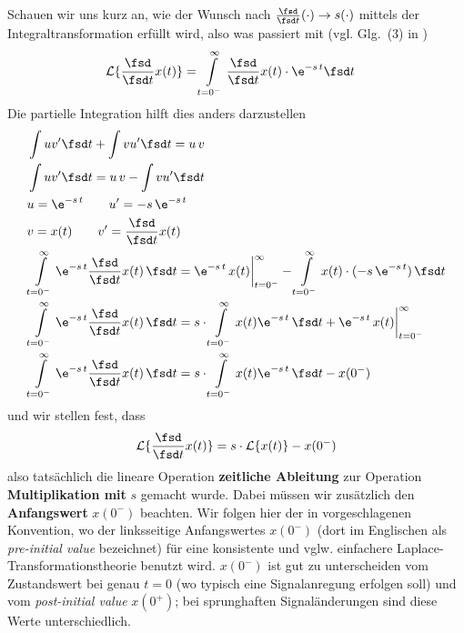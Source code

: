 Schauen wir uns kurz an, wie der Wunsch nach
$\frac{\fsd }{\fsd t} (\cdot) \rightarrow s(\cdot )$
mittels der Integraltransformation erfüllt wird, also was passiert mit (vgl. Glg.~(3) in \cite{Lundberg2007})
\begin{align}
\mathcal{L}\{\frac{\fsd }{\fsd t}  x(t)\} &= \int\limits_{t=0^-}^{\infty} \frac{\fsd }{\fsd t}  x(t) \cdot \e^{-s\,t} \fsd t
\end{align}
Die partielle Integration hilft dies anders darzustellen
\begin{align}
&\int u v' \fsd t + \int v u' \fsd t = u\,v\\
&\int u v' \fsd t = u\,v - \int v u' \fsd t\\
&u = \e^{-s\,t}\qquad u' = -s\,\e^{-s\,t}\\
&v = x(t)\qquad v' = \frac{\fsd }{\fsd t}  x(t)\\
&\int\limits_{t=0^-}^{\infty} \e^{-s\,t} \frac{\fsd }{\fsd t}  x(t) \, \fsd t
= \e^{-s\,t}\,x(t)\bigg|_{t=0^-}^{\infty} - \int\limits_{t=0^-}^{\infty} x(t) \cdot (-s\,\e^{-s\,t}) \, \fsd t\\
&\int\limits_{t=0^-}^{\infty} \e^{-s\,t} \frac{\fsd }{\fsd t}  x(t) \, \fsd t
= s \cdot \int\limits_{t=0^-}^{\infty} x(t) \e^{-s\,t} \, \fsd t
+\e^{-s\,t}\,x(t)\bigg|_{t=0^-}^{\infty}\\
&\int\limits_{t=0^-}^{\infty} \e^{-s\,t} \frac{\fsd }{\fsd t}  x(t) \, \fsd t
= s \cdot \int\limits_{t=0^-}^{\infty} x(t) \e^{-s\,t} \, \fsd t - x(0^-)
\end{align}
und wir stellen fest, dass
\begin{align}
\label{eq:laplace_diff_satz}
\mathcal{L}\{\frac{\fsd }{\fsd t}  x(t)\}  = s \cdot \mathcal{L}\{x(t)\} - x(0^-)
\end{align}
also tatsächlich die lineare Operation \textbf{zeitliche Ableitung} zur Operation
\textbf{Multiplikation mit} $s$ gemacht wurde. Dabei müssen wir zusätzlich den
\textbf{Anfangswert} $x(0^-)$ beachten. Wir folgen hier der in \cite{Lundberg2007}
vorgeschlagenen Konvention, wo der linksseitige Anfangswertes $x(0^-)$
(dort im Englischen als \textit{pre-initial value} bezeichnet) für eine
konsistente und vglw. einfachere Laplace-Transformationstheorie benutzt wird.
$x(0^-)$ ist gut zu unterscheiden vom Zustandswert bei genau $t=0$ (wo typisch
eine Signalanregung erfolgen soll) und vom
\textit{post-initial value} $x(0^+)$; bei sprunghaften Signaländerungen
sind diese Werte unterschiedlich.

